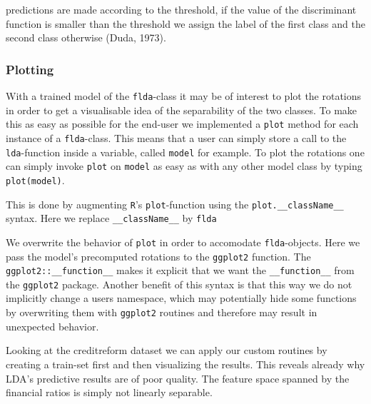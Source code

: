 \documentclass{article}
\begin{document}
predictions are made according to the threshold, if the value of the discriminant function is smaller than the threshold we assign the label of the first class and the second class otherwise (Duda, 1973). 

\subsubsection{Plotting}

With a trained model of the \texttt{flda}-class it may be of interest to plot the rotations in order to get a visualisable idea of the separability of the two classes. To make this as easy as possible for the end-user we implemented a \texttt{plot} method for each instance of a \texttt{flda}-class. This means that a user can simply store a call to the \texttt{lda}-function inside a variable, called \texttt{model} for example. To plot the rotations one can simply invoke \texttt{plot} on \texttt{model} as easy as with any other model class by typing \texttt{plot(model)}.

This is done by augmenting \texttt{R}'s \texttt{plot}-function using the \texttt{plot.\_\_className\_\_} syntax. Here we replace \texttt{\_\_className\_\_} by \texttt{flda}



We overwrite the behavior of \texttt{plot} in order to accomodate \texttt{flda}-objects. Here we pass the model's precomputed rotations to the \texttt{ggplot2} function. The \texttt{ggplot2::\_\_function\_\_} makes it explicit that we want the \texttt{\_\_function\_\_} from the \texttt{ggplot2} package. Another benefit of this syntax is that this way we do not implicitly change a users namespace, which may potentially hide some functions by overwriting them with \texttt{ggplot2} routines and therefore may result in unexpected behavior.

Looking at the creditreform dataset we can apply our custom routines by creating a train-set first and then visualizing the results. This reveals already why LDA's predictive results are of poor quality. The feature space spanned by the financial ratios is simply not linearly separable.



\end{document}
